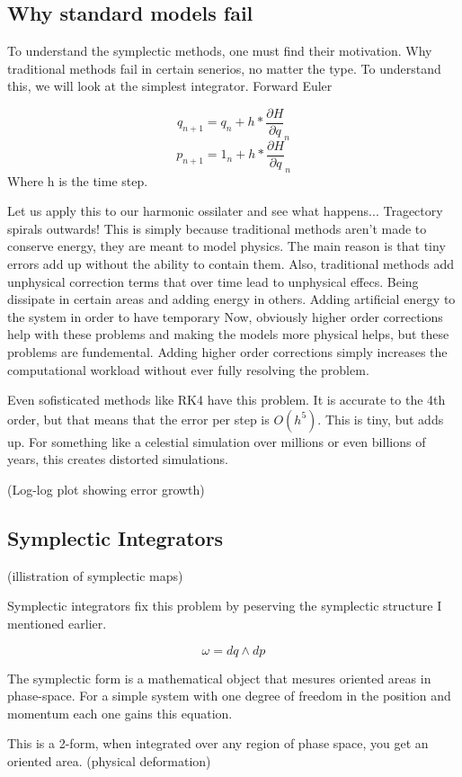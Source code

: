 \subsection{Why standard models fail}
To understand the symplectic methods, one must find their motivation. Why traditional methods fail in certain senerios, no matter the type. To understand this, we will look at the simplest integrator. Forward Euler

\[
q_{n+1} = q_n + h * \frac{\partial H}{\partial q}_n
\]
\[
p_{n+1}=1_n +h * \frac{\partial H}{\partial q}_n
\]
Where h is the time step.

Let us apply this to our harmonic ossilater and see what happens... Tragectory spirals outwards! This is simply because traditional methods aren't made to conserve energy, they are meant to model physics. The main reason is that tiny errors add up without the ability to contain them. Also, traditional methods add unphysical correction terms that over time lead to unphysical effecs. Being dissipate in certain areas and adding energy in others. Adding artificial energy to the system in order to have temporary  Now, obviously higher order corrections help with these problems and making the models more physical helps, but these problems are fundemental. Adding higher order corrections simply increases the computational workload without ever fully resolving the problem.

Even sofisticated methods like RK4 have this problem. It is accurate to the 4th order, but that means that the error per step is $O(h^5)$. This is tiny, but adds up. For something like a celestial simulation over millions or even billions of years, this creates distorted simulations.

(Log-log plot showing error growth)

\subsection{Symplectic Integrators}
(illistration of symplectic maps)

Symplectic integrators fix this problem by peserving the symplectic structure I mentioned earlier.

\[
\omega = dq \wedge dp
\]

The symplectic form is a mathematical object that mesures oriented areas in phase-space. For a simple system with one degree of freedom in the position and momentum each one gains this equation.

This is a 2-form, when integrated over any region of phase space, you get an oriented area.
(physical deformation)

